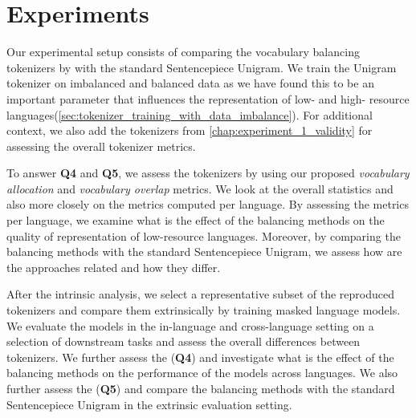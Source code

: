 \section{Experiments}


Our experimental setup consists of comparing the vocabulary balancing tokenizers by \citet{chung_improving_2020,zheng_allocating_2021,liang_xlm-v_2023} with the standard Sentencepiece Unigram. We train the Unigram tokenizer on imbalanced and balanced data as we have found this to be an important parameter that influences the representation of low- and high- resource languages(\autoref{sec:tokenizer_training_with_data_imbalance}). For additional context, we also add the tokenizers from \autoref{chap:experiment_1_validity} for assessing the overall tokenizer metrics.

To answer \textbf{Q4} and \textbf{Q5}, we assess the tokenizers by using our proposed \textit{vocabulary allocation} and \textit{vocabulary overlap} metrics. We look at the overall statistics and also more closely on the metrics computed per language. By assessing the metrics per language, we examine what is the effect of the balancing methods on the quality of representation of low-resource languages. Moreover, by comparing the balancing methods with the standard Sentencepiece Unigram, we assess how are the approaches related and how they differ.

After the intrinsic analysis, we select a representative subset of the reproduced tokenizers and compare them extrinsically by training masked language models. We evaluate the models in the in-language and cross-language setting on a selection of downstream tasks and assess the overall differences between tokenizers. We further assess the (\textbf{Q4}) and investigate what is the effect of the balancing methods on the performance of the models across languages. We also further assess the (\textbf{Q5}) and compare the balancing methods with the standard Sentencepiece Unigram in the extrinsic evaluation setting.

